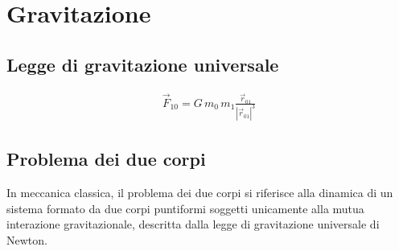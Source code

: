 \documentclass[letterpaper,10pt,italian]{jupyterBook}
\begin{document}
\section{Gravitazione}
\label{\detokenize{ch/mechanics/dynamics-motion-gravitation:gravitazione}}\label{\detokenize{ch/mechanics/dynamics-motion-gravitation:physics-hs-mechanics-dynamics-motion-gravitation}}\label{\detokenize{ch/mechanics/dynamics-motion-gravitation::doc}}



\subsection{Legge di gravitazione universale}
\label{\detokenize{ch/mechanics/dynamics-motion-gravitation:legge-di-gravitazione-universale}}\begin{equation*}
\begin{split}\vec{F}_{10} = G \, m_0 \, m_1 \frac{\vec{r}_{01}}{\left|\vec{r}_{01}\right|^3}\end{split}
\end{equation*}

\subsection{Problema dei due corpi}
\label{\detokenize{ch/mechanics/dynamics-motion-gravitation:problema-dei-due-corpi}}
\sphinxAtStartPar
In meccanica classica, il problema dei due corpi si riferisce alla dinamica di un sistema formato da due corpi puntiformi soggetti unicamente alla mutua interazione gravitazionale, descritta dalla legge di gravitazione universale di Newton.
\end{document}
